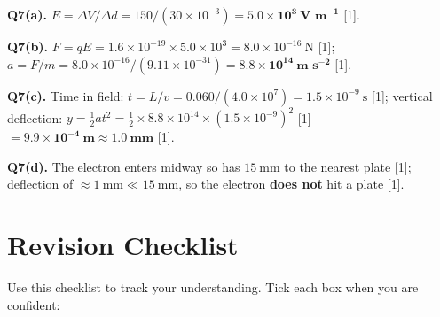 \begin{markscheme}
\vspace{0.5em}\textbf{Q7(a).} $E = \Delta V/\Delta d = 150/(30\times10^{-3}) = \mathbf{5.0\times10^3\ \text{V m}^{-1}}$ [1].

\vspace{0.5em}\textbf{Q7(b).} $F = qE = 1.6\times10^{-19}\times5.0\times10^3 = 8.0\times10^{-16}\ \text{N}$ [1]; $a = F/m = 8.0\times10^{-16}/(9.11\times10^{-31}) = \mathbf{8.8\times10^{14}\ \text{m s}^{-2}}$ [1].

\vspace{0.5em}\textbf{Q7(c).} Time in field: $t = L/v = 0.060/(4.0\times10^7) = 1.5\times10^{-9}\ \text{s}$ [1]; vertical deflection: $y = \tfrac{1}{2}at^2 = \tfrac{1}{2}\times8.8\times10^{14}\times(1.5\times10^{-9})^2$ [1] $= \mathbf{9.9\times10^{-4}\ \text{m} \approx 1.0\ \text{mm}}$ [1].

\vspace{0.5em}\textbf{Q7(d).} The electron enters midway so has $15\ \text{mm}$ to the nearest plate [1]; deflection of $\approx 1\ \text{mm} \ll 15\ \text{mm}$, so the electron \textbf{does not} hit a plate [1].

\end{markscheme}

\newpage
\section{Revision Checklist}

Use this checklist to track your understanding. Tick each box when you are confident:

